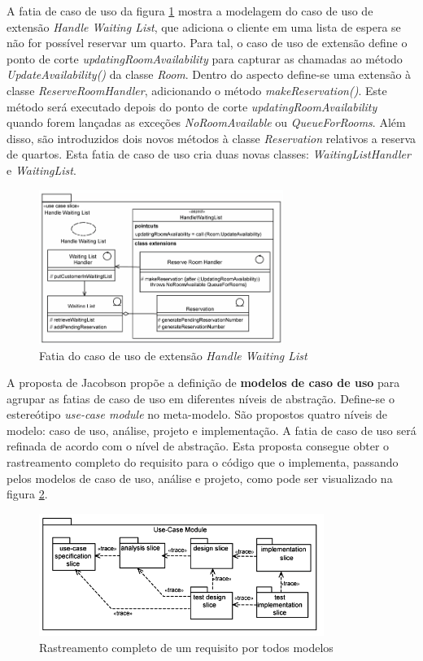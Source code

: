 A fatia de caso de uso da figura \ref{fig:jacobson_handle_waiting_list_slice} mostra a modelagem do caso de uso de extensão \textit{Handle Waiting
List}, que adiciona o cliente em uma lista de espera se não for possível reservar um quarto. Para tal, o caso de uso de extensão define o ponto de
corte \textit{updatingRoomAvailability} para capturar as chamadas ao método \textit{UpdateAvailability()} da classe \textit{Room}. Dentro do aspecto
define-se uma extensão à classe \textit{ReserveRoomHandler}, adicionando o método \textit{makeReservation()}. Este método será executado depois
do ponto de corte \textit{updatingRoomAvailability} quando forem lançadas as exceções \textit{NoRoomAvailable} ou \textit{QueueForRooms}. Além disso,
são introduzidos dois novos métodos à classe \textit{Reservation} relativos a reserva de quartos. Esta fatia de caso de uso cria duas novas classes:
\textit{WaitingListHandler} e \textit{WaitingList}.

\begin{figure}
	\centering
	\includegraphics[width=300px]{img/jacobson_handle_waiting_list_slice.png}
	\caption{Fatia do caso de uso de extensão \textit{Handle Waiting List}}\label{fig:jacobson_handle_waiting_list_slice}
\end{figure}

A proposta de Jacobson propõe a definição de \textbf{modelos de caso de uso} para agrupar as fatias de caso de uso em
diferentes níveis de abstração. Define-se o estereótipo \textit{use-case module} no meta-modelo. São propostos quatro níveis de modelo: caso de uso,
análise, projeto e implementação. A fatia de caso de uso será refinada de acordo com o nível de abstração. Esta proposta consegue obter o rastreamento
completo do requisito para o código que o implementa, passando pelos modelos de caso de uso, análise e projeto, como pode ser visualizado 
na figura \ref{fig:jacobson_use_case_modules}. 

\begin{figure}
	\centering
	\includegraphics[width=350px]{img/jacobson_use_case_modules.png}
	\caption{Rastreamento completo de um requisito por todos modelos}\label{fig:jacobson_use_case_modules}
\end{figure}

